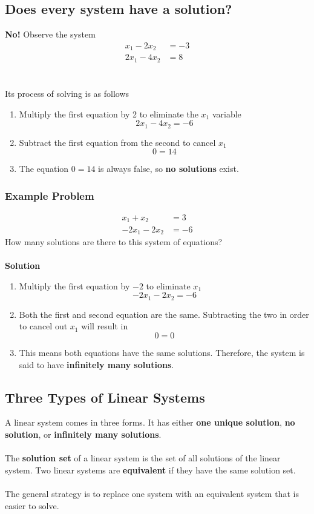\subsection{Does every system have a solution?}
\textbf{No!} Observe the system
\[
\begin{aligned}
  x_1 - 2x_2 &= -3 \\
  2x_1 - 4x_2 &= 8
\end{aligned}
\] \\\\
Its process of solving is as follows
\begin{enumerate}
  \item Multiply the first equation by 2 to eliminate the $x_1$ variable
    \[
      2x_1 - 4x_2 = -6
    \]
  \item Subtract the first equation from the second to cancel $x_1$
    \[
      0 = 14
    \]
  \item The equation $0 = 14$ is always false, so \textbf{no solutions} exist.
\end{enumerate}
\subsubsection{Example Problem}
\[
  \begin{aligned}
    x_1 + x_2 &= 3 \\
    -2x_1 - 2x_2 &= -6
  \end{aligned}
\]
How many solutions are there to this system of equations? \\\\
\textbf{Solution}
\begin{enumerate}
  \item Multiply the first equation by $-2$ to eliminate $x_1$
    \[
      -2x_1 - 2x_2 = -6
    \]
  \item Both the first and second equation are the same. Subtracting the two in order to cancel out $x_1$ will result in
    \[
      0 = 0
    \]
  \item This means both equations have the same solutions. Therefore, the system is said to have \textbf{infinitely many solutions}.
\end{enumerate}
\subsection{Three Types of Linear Systems}
A linear system comes in three forms. It has either \textbf{one unique solution}, 
\textbf{no solution}, or \textbf{infinitely many solutions}. \\\\
The \textbf{solution set} of a linear system is the set of all solutions of the linear system. Two linear systems are \textbf{equivalent} if they have the same solution set. \\\\
The general strategy is to replace one system with an equivalent system that is easier to solve.
